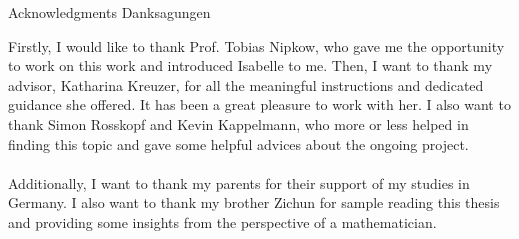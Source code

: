 \makeatletter
{}
{}
{}
\makeatother
\thispagestyle{empty}

\vspace*{20mm}

\begin{center}
\makeatletter
{}
{ Acknowledgments}
{ Danksagungen}
\makeatother
\end{center}

\vspace{10mm}

Firstly, I would like to thank Prof. Tobias Nipkow, who gave me the opportunity to work on this work 
and introduced Isabelle to me. Then, I want to thank my advisor, Katharina Kreuzer,
for all the meaningful instructions and dedicated guidance she offered. 
It has been a great pleasure to work with her. 
I also want to thank Simon Rosskopf and Kevin Kappelmann, who more or less helped in finding this topic 
and gave some helpful advices about the ongoing project. \\\\
Additionally, I want to thank my parents for their support of my studies in Germany. 
I also want to thank my brother Zichun for sample reading this thesis and providing some insights 
from the perspective of a mathematician. 

\cleardoublepage{}

